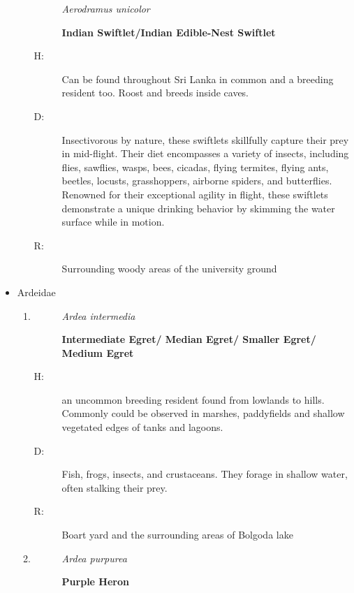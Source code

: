 \begin{itemize}
\begin{enumerate}
\begin{description}
\item[]%
\textit{Aerodramus unicolor}%
\item[]%
\textbf{Indian Swiftlet/Indian Edible{-}Nest Swiftlet}%
\end{description}%
\begin{description}%
\item[H: ]%
Can be found throughout Sri Lanka in common and a breeding resident too. Roost and breeds inside caves.%
\item[D: ]%
Insectivorous by nature, these swiftlets skillfully capture their prey in mid{-}flight. Their diet encompasses a variety of insects, including flies, sawflies, wasps, bees, cicadas, flying termites, flying ants, beetles, locusts, grasshoppers, airborne spiders, and butterflies. Renowned for their exceptional agility in flight, these swiftlets demonstrate a unique drinking behavior by skimming the water surface while in motion.%
\item[R: ]%
Surrounding woody areas of the university ground%
\end{description}%
\end{enumerate}%
\item%
Ardeidae%
\begin{enumerate}%
\item%
\begin{description}%
\item[]%
\textit{Ardea intermedia}%
\item[]%
\textbf{Intermediate Egret/ Median Egret/ Smaller Egret/ Medium Egret}%
\end{description}%
\begin{description}%
\item[H: ]%
an uncommon breeding resident found from lowlands to hills. Commonly could be observed in marshes, paddyfields and shallow vegetated edges of tanks and lagoons.%
\item[D: ]%
Fish, frogs, insects, and crustaceans. They forage in shallow water, often stalking their prey.%
\item[R: ]%
Boart yard and the surrounding areas of Bolgoda lake%
\end{description}%
\item%
\begin{description}%
\item[]%
\textit{Ardea purpurea}%
\item[]%
\textbf{Purple Heron}%
\end{description}%
\begin{description}%

\end{description}
\end{enumerate}
\end{itemize}
